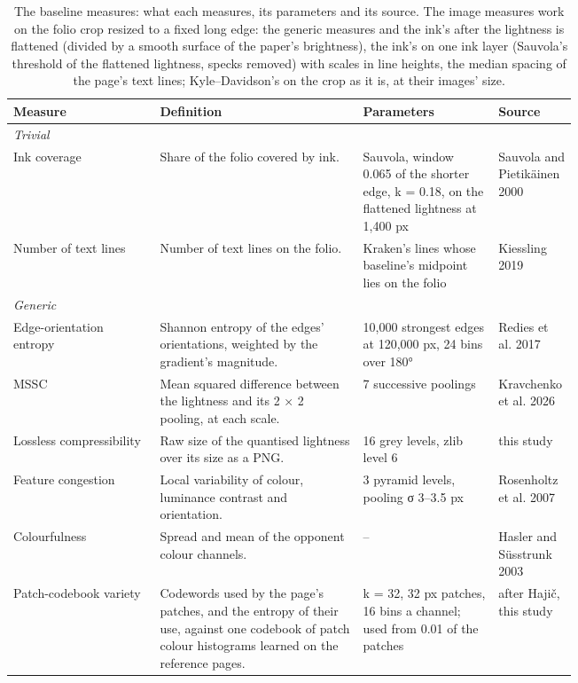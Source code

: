 \begin{table}[htbp]
  \centering
  \caption{The baseline measures: what each measures, its parameters and its source. The image measures work on the folio crop resized to a fixed long edge: the generic measures and the ink's after the lightness is flattened (divided by a smooth surface of the paper's brightness), the ink's on one ink layer (Sauvola's threshold of the flattened lightness, specks removed) with scales in line heights, the median spacing of the page's text lines; Kyle--Davidson's on the crop as it is, at their images' size.}
  \label{tab:baseline_measures}
  \begin{tabular}{lp{0.36\linewidth}p{0.24\linewidth}p{0.14\linewidth}}
    \toprule
    Measure & Definition & Parameters & Source \\
    \midrule
    \emph{Trivial} &  &  &  \\
    Ink coverage & Share of the folio covered by ink. & Sauvola, window 0.065 of the shorter edge, k = 0.18, on the flattened lightness at 1,400 px & Sauvola and Pietikäinen 2000 \\
    Number of text lines & Number of text lines on the folio. & Kraken's lines whose baseline's midpoint lies on the folio & Kiessling 2019 \\
    \midrule
    \emph{Generic} &  &  &  \\
    Edge-orientation entropy & Shannon entropy of the edges' orientations, weighted by the gradient's magnitude. & 10,000 strongest edges at 120,000 px, 24 bins over 180° & Redies et al. 2017 \\
    MSSC & Mean squared difference between the lightness and its 2 × 2 pooling, at each scale. & 7 successive poolings & Kravchenko et al. 2026 \\
    Lossless compressibility & Raw size of the quantised lightness over its size as a PNG. & 16 grey levels, zlib level 6 & this study \\
    Feature congestion & Local variability of colour, luminance contrast and orientation. & 3 pyramid levels, pooling σ 3--3.5 px & Rosenholtz et al. 2007 \\
    Colourfulness & Spread and mean of the opponent colour channels. & -- & Hasler and Süsstrunk 2003 \\
    Patch-codebook variety & Codewords used by the page's patches, and the entropy of their use, against one codebook of patch colour histograms learned on the reference pages. & k = 32, 32 px patches, 16 bins a channel; used from 0.01 of the patches & after Hajič, this study \\

\end{tabular}
\end{table}

